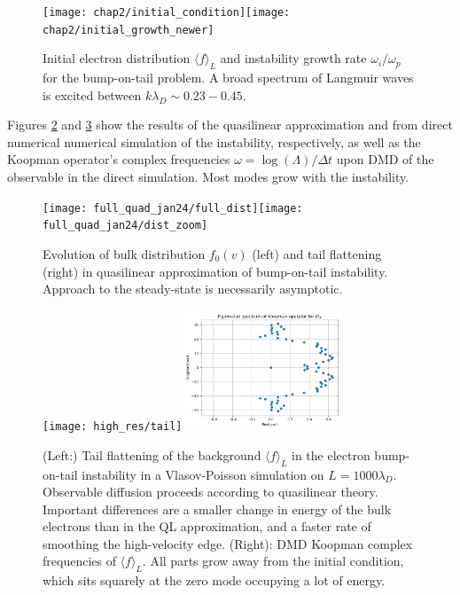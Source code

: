 \documentclass{article}
\begin{document}
\begin{figure}[hb!]
  \centering
  \texttt{[image: chap2/initial\_condition]}\texttt{[image: chap2/initial\_growth\_newer]}
  \caption{Initial electron distribution $\langle f\rangle_L$ and instability growth rate $\omega_i/\omega_p$ for the bump-on-tail problem. A broad spectrum of Langmuir waves is excited between $k\lambda_D \sim 0.23-0.45$.}\label{ic_ql}
\end{figure}
Figures \ref{sol_ql_full} and \ref{vp_tail} show the results of the quasilinear approximation and from direct numerical numerical simulation of the instability, respectively, as well as the Koopman operator's complex frequencies $\omega = \log(\Lambda)/\Delta t$ upon DMD of the observable in the direct simulation. Most modes grow with the instability. 
\begin{figure}[ht]
  \centering
  \texttt{[image: full\_quad\_jan24/full\_dist]}\texttt{[image: full\_quad\_jan24/dist\_zoom]}
  \caption{Evolution of bulk distribution $f_0(v)$ (left) and tail flattening (right) in quasilinear approximation of bump-on-tail instability. Approach to the steady-state is necessarily asymptotic.}\label{sol_ql_full}
\end{figure}
\begin{figure}[h]
  \centering
  \texttt{[image: high\_res/tail]}\includegraphics[width=0.4255\textwidth]{avgf/pdf_dmd_freqs_zoom}%
  \caption{(Left:) Tail flattening of the background $\langle f\rangle_L$ in the electron bump-on-tail instability in a Vlasov-Poisson simulation on $L=1000\lambda_D$. Observable diffusion proceeds according to quasilinear theory. Important differences are a smaller change in energy of the bulk electrons than in the QL approximation, and a faster rate of smoothing the high-velocity edge. (Right): DMD Koopman complex frequencies of $\langle f\rangle_L$. All parts grow away from the initial condition, which sits squarely at the zero mode occupying a lot of energy.}\label{vp_tail}
\end{figure}
\end{document}

